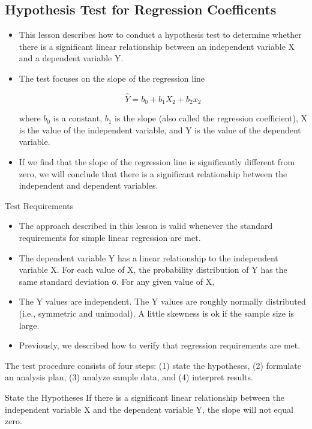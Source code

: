 \documentclass[a4paper,12pt]{article}
\begin{document}
\subsection*{Hypothesis Test for Regression Coefficents}
\begin{itemize}
\item 
This lesson describes how to conduct a hypothesis test to determine whether there is a significant linear relationship between an independent variable X and a dependent variable Y. 

\item The test focuses on the slope of the regression line

\[ \hat{Y} = b_0 + b_1X_2 + b_2x_2\]

where $b_0$ is a constant, $b_1$ is the slope (also called the regression coefficient), X is the value of the independent variable, and Y is the value of the dependent variable.

\item If we find that the slope of the regression line is significantly different from zero, we will conclude that there is a significant relationship between the independent and dependent variables.
\end{itemize}
Test Requirements
\begin{itemize}
\item The approach described in this lesson is valid whenever the standard requirements for simple linear regression are met.

\item The dependent variable Y has a linear relationship to the independent variable X.
For each value of X, the probability distribution of Y has the same standard deviation σ.
For any given value of X,

\item The Y values are independent.
The Y values are roughly normally distributed (i.e., symmetric and unimodal). A little skewness is ok if the sample size is large.
\item Previously, we described how to verify that regression requirements are met.

\end{itemize}

The test procedure consists of four steps: (1) state the hypotheses, (2) formulate an analysis plan, (3) analyze sample data, and (4) interpret results.

State the Hypotheses
If there is a significant linear relationship between the independent variable X and the dependent variable Y, the slope will not equal zero.
\end{document}
